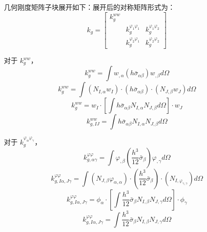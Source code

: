 几何刚度矩阵子块展开如下：展开后的对称矩阵形式为：
\begin{equation}
k_g = \begin{bmatrix}
k_g^{ww} & & \\
& k_g^{\varphi_1\varphi_1} & k_g^{\varphi_1\varphi_2} \\
& k_g^{\varphi_2\varphi_1} & k_g^{\varphi_2\varphi_2}
\end{bmatrix}
\end{equation}

对于 $k_g^{ww}$，
\begin{equation}
k_g^{ww} = \int w_{,\alpha}(h\bar{\sigma}_{\alpha\beta})w_{,\beta}d\Omega
\end{equation}
\begin{equation}
k_g^{ww} = \int(N_{I,\alpha}w_I)\cdot(h\bar{\sigma}_{\alpha\beta})\cdot(N_{J,\beta}w_J)d\Omega
\end{equation}
\begin{equation}
k_g^{ww} = w_I\cdot\left[\int h\bar{\sigma}_{\alpha\beta}N_{I,\alpha}N_{J,\beta}d\Omega\right]\cdot w_J
\end{equation}
\begin{equation}
\boxed{k_{g,IJ}^{ww} = \int h\bar{\sigma}_{\alpha\beta}N_{I,\alpha}N_{J,\beta}d\Omega}
\end{equation}

对于 $k_g^{\varphi_\alpha\varphi_\gamma}$，
\begin{equation}
k_{g,\alpha\gamma}^{\varphi\varphi} = \int \varphi_{,\beta}\left(\frac{h^3}{12}\bar{\sigma}_{\beta}\right)\varphi_{,\gamma}d\Omega
\end{equation}
\begin{equation}
k_{g,I\alpha,J\gamma}^{\varphi\varphi} = \int(N_{J,\beta}\varphi_{\alpha,\alpha})\cdot\left(\frac{h^3}{12}\bar{\sigma}_{\beta}\right)\cdot(N_{I,\varphi_{\gamma,\gamma}})d\Omega
\end{equation}
\begin{equation}
k_{g,I\alpha,J\gamma}^{\varphi\varphi} = \phi_\alpha\cdot\left[\int\frac{h^3}{12}\bar{\sigma}_{\beta}N_{I,\beta}N_{J,\gamma}d\Omega\right]\cdot\phi_\gamma
\end{equation}
\begin{equation}
\boxed{k_{g,I\alpha,J\gamma}^{\varphi\varphi} = \int\frac{h^3}{12}\bar{\sigma}_{\beta}N_{I,\beta}N_{J,\gamma}d\Omega}
\end{equation}

